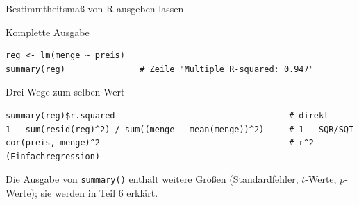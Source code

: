 \documentclass[aspectratio=169,11pt]{beamer}
\begin{document}
\begin{frame}[fragile]{Bestimmtheitsmaß von R ausgeben lassen}
  \small\lstset{basicstyle=\ttfamily\footnotesize,aboveskip=3pt,belowskip=3pt}
  \begin{block}{Komplette Ausgabe}
\begin{lstlisting}
reg <- lm(menge ~ preis)
summary(reg)               # Zeile "Multiple R-squared: 0.947"
\end{lstlisting}
  \end{block}

  \begin{exampleblock}{Drei Wege zum selben Wert}
\begin{lstlisting}
summary(reg)$r.squared                                   # direkt
1 - sum(resid(reg)^2) / sum((menge - mean(menge))^2)     # 1 - SQR/SQT
cor(preis, menge)^2                                      # r^2 (Einfachregression)
\end{lstlisting}
  \end{exampleblock}

  \footnotesize Die Ausgabe von \texttt{summary()} enthält weitere Größen
  (Standardfehler, $t$-Werte, $p$-Werte); sie werden in Teil 6 erklärt.\par
\end{frame}
\end{document}
